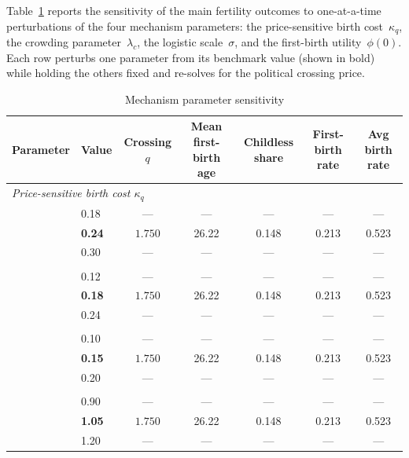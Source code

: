 \documentclass[11pt]{article}
\begin{document}
Table~\ref{tab:sensitivity} reports the sensitivity of the main fertility outcomes to
one-at-a-time perturbations of the four mechanism parameters: the price-sensitive birth
cost~$\kappa_q$, the crowding parameter~$\lambda_c$, the logistic scale~$\sigma$, and the
first-birth utility~$\phi(0)$. Each row perturbs one parameter from its benchmark value
(shown in bold) while holding the others fixed and re-solves for the political crossing price.

\begin{table}[htbp]
\centering
\caption{Mechanism parameter sensitivity}
\label{tab:sensitivity}
\small
\begin{tabular}{ll ccccc}
\toprule
Parameter & Value & Crossing $q$ & Mean first-birth age & Childless share & First-birth rate & Avg birth rate \\
\midrule
\multicolumn{7}{l}{\textit{Price-sensitive birth cost $\kappa_q$}} \\
 & 0.18  & --- & --- & --- & --- & --- \\
 & \textbf{0.24} & $1.750$ & 26.22 & 0.148 & 0.213 & 0.523 \\
 & 0.30  & --- & --- & --- & --- & --- \\
\addlinespace
\multicolumn{7}{l}{\textit{Crowding parameter $\lambda_c$}} \\
 & 0.12  & --- & --- & --- & --- & --- \\
 & \textbf{0.18} & $1.750$ & 26.22 & 0.148 & 0.213 & 0.523 \\
 & 0.24  & --- & --- & --- & --- & --- \\
\addlinespace
\multicolumn{7}{l}{\textit{Logistic scale $\sigma$}} \\
 & 0.10  & --- & --- & --- & --- & --- \\
 & \textbf{0.15} & $1.750$ & 26.22 & 0.148 & 0.213 & 0.523 \\
 & 0.20  & --- & --- & --- & --- & --- \\
\addlinespace
\multicolumn{7}{l}{\textit{First-birth utility $\phi(0)$}} \\
 & 0.90  & --- & --- & --- & --- & --- \\
 & \textbf{1.05} & $1.750$ & 26.22 & 0.148 & 0.213 & 0.523 \\
 & 1.20  & --- & --- & --- & --- & --- \\
\bottomrule
\end{tabular}
\end{table}
\end{document}
